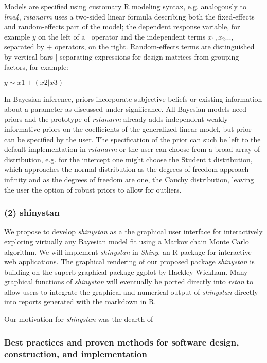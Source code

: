 \documentclass[11pt,notitlepage]{article}
\begin{document}
Models are specified using customary R modeling syntax, e.g. analogously to \textit{lme4}, \textit{rstanarm} uses a two-sided linear formula describing both the fixed-effects and random-effects part of the model; the dependent response variable, for example $y$ on the left of a $~$ operator and the independent terms $x_1, x_2...$, separated by $+$ operators, on the right. Random-effects terms are distinguished by vertical bars $|$ separating expressions for design matrices from grouping factors, for example:

$y \sim x1 +(x2|x3)$

In Bayesian inference, priors incorporate subjective beliefs or existing information about a parameter as discussed under significance. All Bayesian models need priors and the prototype of \textit{rstanarm} already adds independent weakly informative priors on the coefficients of the generalized linear model, but prior can be specified by the user. The specification of the prior can such be left to the default implementation in \textit{rstanarm} or the user can choose from a broad array of distribution, e.g. for the intercept one might choose the Student t distribution, which approaches the normal distribution as the degrees of freedom approach infinity and as the degrees of freedom are one, the Cauchy distribution, leaving the user the option of robust priors to allow for outliers. 


\subsubsection*{(2) shinystan}
We propose to develop \href{http://andrewgelman.com/2015/03/02/introducing-shinystan/}{\textit{shinystan}} as a the graphical user interface for interactively exploring virtually any Bayesian model fit using a Markov chain Monte Carlo algorithm. We will implement \textit{shinystan} in \textit{Shiny}, an R package for interactive web applications. The graphical rendering of our proposed package \textit{shinystan} is building on the superb graphical package ggplot by Hackley Wickham. Many graphical functions of \textit{shinystan} will eventually be ported directly into \textit{rstan} to allow users to integrate the graphical and numerical output of \textit{shinystan} directly into reports generated with the markdown in R.

Our motivation for \textit{shinystan} was the dearth of 
 
\subsubsection*{Best practices and proven methods for software design, construction, and implementation}
\end{document}
